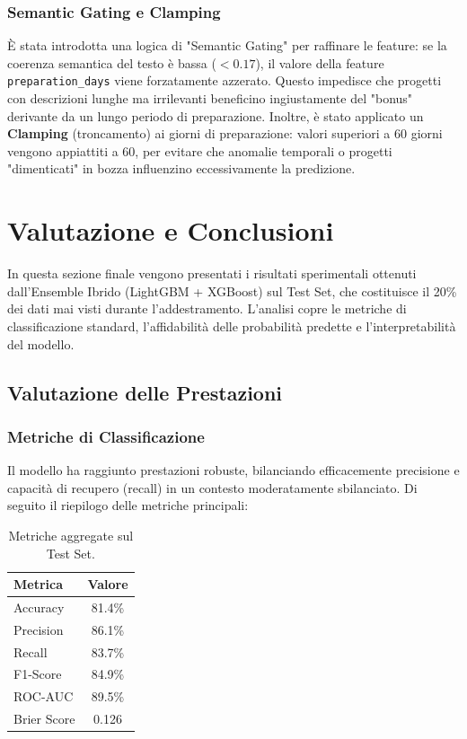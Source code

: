 \documentclass[a4paper,14pt]{extarticle}
\begin{document}
\subsubsection{Semantic Gating e Clamping}
È stata introdotta una logica di "Semantic Gating" per raffinare le feature: se la coerenza semantica del testo è bassa ($< 0.17$), il valore della feature \texttt{preparation\_days} viene forzatamente azzerato. Questo impedisce che progetti con descrizioni lunghe ma irrilevanti beneficino ingiustamente del "bonus" derivante da un lungo periodo di preparazione.
Inoltre, è stato applicato un \textbf{Clamping} (troncamento) ai giorni di preparazione: valori superiori a 60 giorni vengono appiattiti a 60, per evitare che anomalie temporali o progetti "dimenticati" in bozza influenzino eccessivamente la predizione.

\section{Valutazione e Conclusioni}

In questa sezione finale vengono presentati i risultati sperimentali ottenuti dall'Ensemble Ibrido (LightGBM + XGBoost) sul Test Set, che costituisce il 20\% dei dati mai visti durante l'addestramento. L'analisi copre le metriche di classificazione standard, l'affidabilità delle probabilità predette e l'interpretabilità del modello.

\subsection{Valutazione delle Prestazioni}

\subsubsection{Metriche di Classificazione}
Il modello ha raggiunto prestazioni robuste, bilanciando efficacemente precisione e capacità di recupero (recall) in un contesto moderatamente sbilanciato. Di seguito il riepilogo delle metriche principali:

\begin{table}[htbp]
    \centering
    \begin{tabular}{lc} \toprule
        \textbf{Metrica} & \textbf{Valore} \\ \midrule
        Accuracy & 81.4\% \\
        Precision & 86.1\% \\
        Recall & 83.7\% \\
        F1-Score & 84.9\% \\
        ROC-AUC & 89.5\% \\
        Brier Score & 0.126 \\ \bottomrule
    \end{tabular}
    \caption{Metriche aggregate sul Test Set.}
    \label{tab:metrics}
\end{table}
\end{document}
